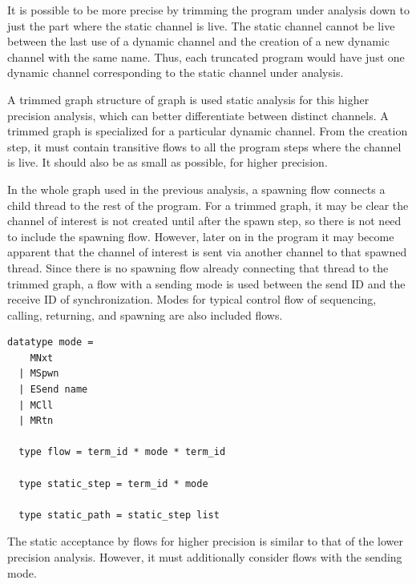 \documentclass[10pt]{article}
\begin{document}
It is possible to be more precise by trimming the program under analysis down to just the part
where the static channel is live. The static channel cannot be live between the last use of a
dynamic channel and the creation of a new dynamic channel with the same name.  Thus, each
truncated program would have just one dynamic channel corresponding to the static channel under
analysis. 

A trimmed graph structure of graph is used static analysis for this higher precision
analysis, which can better differentiate between distinct channels. 
A trimmed graph is specialized for a particular dynamic channel.  From the creation
step, it must contain transitive flows to all the program steps where the
channel is live. It should also be as small as possible, for higher precision.

In the whole graph used in the previous analysis, a spawning flow
connects a child thread to the rest of the program.  For a trimmed graph,
it may be clear the channel of interest is not created until after the spawn step,
so there is not need to include the spawning flow.  However, later on in the
program it may become apparent that the channel of interest is sent via another channel to
that spawned thread.  Since there is no spawning flow already connecting that
thread to the trimmed graph, a flow with a sending mode is used between the
send ID and the receive ID of synchronization. Modes for typical control flow of
sequencing, calling, returning, and spawning are also included flows.

\begin{lstlisting}[language=logic, mathescape]
  datatype mode =
    MNxt
  | MSpwn
  | ESend name
  | MCll
  | MRtn

  type flow = term_id * mode * term_id

  type static_step = term_id * mode

  type static_path = static_step list
\end{lstlisting}

The static acceptance by flows for higher precision is similar to that of the lower precision analysis.
However, it must additionally consider flows with the sending mode. 
\end{document}
